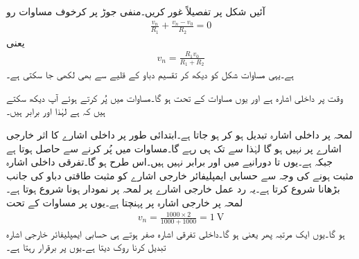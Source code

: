 آئیں شکل  پر تفصیلاً غور کریں۔منفی جوڑ پر کرخوف مساوات رو
\begin{align*}
\frac{v_n}{R_1}+\frac{v_n-v_0}{R_2}=0
\end{align*}
یعنی
\begin{align}\label{مساوات_حسابی_مثبت_ایمپلیفائر_منفی_جوڑ}
v_n=\frac{R_1 v_0}{R_1+R_2}
\end{align}
ہے۔یہی مساوات شکل کو دیکھ کر تقسیم دباو کے قلیے سے بھی لکھی جا سکتی ہے۔

وقت  پر داخلی اشارہ  ہے اور یوں مساوات  کے تحت  ہو گا۔مساوات  میں  پُر کرتے ہوئے آپ دیکھ سکتے ہیں کہ  ہے لہٰذا اور  برابر ہیں۔

لمحہ  پر داخلی اشارہ تبدیل ہو کر  ہو جاتا ہے۔ابتدائی طور پر داخلی اشارے کا اثر خارجی اشارے پر نہیں ہو گا لہٰذا  سے  تک   ہی رہے گا۔مساوات  میں  پُر کرنے سے  حاصل ہوتا ہے جبکہ  ہے۔یوں  تا  دورانیے میں  اور  برابر نہیں ہیں۔اس طرح  ہو گا۔تفرقی داخلی اشارہ  مثبت ہونے کی وجہ سے حسابی ایمپلیفائر خارجی اشارے کو مثبت طاقتی دباو کی جانب بڑھانا شروع کرتا ہے۔یہ رد  عمل خارجی اشارے پر  لمحہ  پر نمودار ہونا شروع ہوتا ہے۔لمحہ  پر خارجی اشارہ  پر پہنچتا ہے۔یوں  پر  مساوات  کے تحت
\begin{align*}
v_n=\frac{1000 \times 2}{1000+1000}=\SI{1}{\volt}
\end{align*}
ہو گا۔یوں ایک مرتبہ پھر  یعنی  ہو گا۔داخلی تفرقی اشارہ صفر ہوتے ہی حسابی ایمپلیفائر خارجی اشارہ تبدیل کرنا روک دیتا ہے۔یوں  پر برقرار رہتا ہے۔


